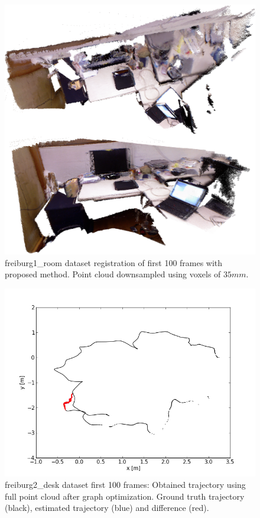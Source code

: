 \begin{figure}[H]
\begin{center}
\includegraphics[scale=0.27]{images/freiburg1_room.png}
\caption{freiburg1\_room dataset registration of first 100 frames with proposed method. Point cloud downsampled using voxels of $35mm$.}
\end{center}
\end{figure}


\begin{figure}[H]
\begin{center}
\includegraphics[scale=0.75]{images/freiburg2_desk_1_100_fullcloud_optimized.png}
\caption{freiburg2\_desk dataset first 100 frames: Obtained trajectory using full point cloud after graph optimization. Ground truth trajectory (black), estimated trajectory (blue) and difference (red).}
\end{center}
\end{figure}

